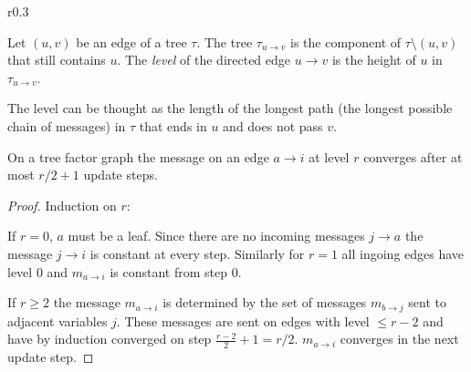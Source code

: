 \begin{wrapfigure}{r}{0.3\textwidth}

\end{wrapfigure}
\begin{definition} Let $(u, v)$ be an edge of a tree $\tau$. \newline
The tree $\tau_{u \rightarrow v}$ is the component of $\tau \setminus (u, v)$ that still contains $u$. The \emph{level} of the directed edge $u \rightarrow v$ is the height of $u$ in $\tau_{u \rightarrow v}$. 
\end{definition}
The level can be thought as the length of the longest path (the longest possible chain of messages) in $\tau$  that ends in $u$ and does not pass $v$.
\begin{lemma}\cite{survprob}
On a tree factor graph the message on an edge $a \rightarrow i$ at level $r$ converges after at most $r/2 + 1$ update steps.
\begin{proof} Induction on $r$: 

 If $r = 0$, $a$ must be a leaf. Since there are no incoming messages $j \rightarrow a$ the message  $j \rightarrow i$ is constant at every step. \newline
Similarly for $r = 1$ all ingoing edges have level $0$ and $m_{a \rightarrow i}$ is constant from step $0$.

 If $r \geq 2$ the message $m_{a \rightarrow i}$ is determined by the set of messages $m_{b \rightarrow j}$ sent to adjacent variables $j$. These messages are sent on edges with level $\leq r-2$ and have by induction converged on step $\frac{r-2}{2} + 1 = r / 2$. $m_{a \rightarrow i}$ converges in the next update step.
\end{proof}
\end{lemma}

